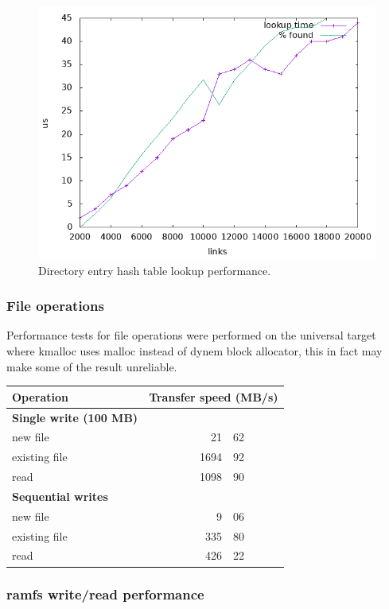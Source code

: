 \begin{figure}
  \includegraphics[width=15cm]{plots/dh_lookup}
  \centering
  \caption{Directory entry hash table lookup performance.}
  \label{figure:dhlookup_perf}
\end{figure}

\subsubsection{File operations}

Performance tests for file operations were performed on the universal target
where kmalloc uses malloc instead of dynem block allocator, this in fact may
make some of the result unreliable.

\begin{tabular}{l r@{.}l}
\textbf{Operation} &
\multicolumn{2}{c}{\textbf{Transfer speed (MB/s)}} \\
\hline
\textbf{Single write (100 MB)} && \\
new file      & 21&62 \\
existing file & 1694&92 \\
read          & 1098&90 \\
\textbf{Sequential writes} && \\
new file      & 9&06 \\
existing file & 335&80 \\
read          & 426&22 \\
\end{tabular}

\subsubsection{ramfs write/read performance}

